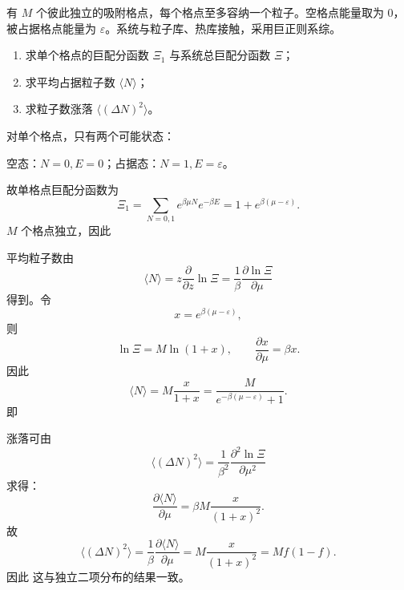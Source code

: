 \begin{question}
有 $M$ 个彼此独立的吸附格点，每个格点至多容纳一个粒子。空格点能量取为 $0$，被占据格点能量为 $\varepsilon$。系统与粒子库、热库接触，采用巨正则系综。

\begin{enumerate}[label=(\arabic*),leftmargin=2.5em]
  \item 求单个格点的巨配分函数 $\Xi_1$ 与系统总巨配分函数 $\Xi$；
  \item 求平均占据粒子数 $\langle N\rangle$；
  \item 求粒子数涨落 $\langle(\Delta N)^2\rangle$。
\end{enumerate}

\begin{solution}
对单个格点，只有两个可能状态：

空态：$N=0,E=0$；\qquad 占据态：$N=1,E=\varepsilon$。

故单格点巨配分函数为
\[
\Xi_1=\sum_{N=0,1} e^{\beta\mu N}e^{-\beta E}
=1+e^{\beta(\mu-\varepsilon)}.
\]
$M$ 个格点独立，因此

平均粒子数由
\[
\langle N\rangle
=z\frac{\partial}{\partial z}\ln \Xi
=\frac{1}{\beta}\frac{\partial \ln\Xi}{\partial\mu}
\]
得到。令
\[
x=e^{\beta(\mu-\varepsilon)},
\]
则
\[
\ln\Xi=M\ln(1+x),
\qquad
\frac{\partial x}{\partial\mu}=\beta x.
\]
因此
\[
\langle N\rangle
=M\frac{x}{1+x}
=
\frac{M}{e^{-\beta(\mu-\varepsilon)}+1}.
\]
即

涨落可由
\[
\langle(\Delta N)^2\rangle
=\frac{1}{\beta^2}\frac{\partial^2 \ln\Xi}{\partial\mu^2}
\]
求得：
\[
\frac{\partial \langle N\rangle}{\partial\mu}
=\beta M\frac{x}{(1+x)^2}.
\]
故
\[
\langle(\Delta N)^2\rangle
=\frac{1}{\beta}\frac{\partial \langle N\rangle}{\partial\mu}
=M\frac{x}{(1+x)^2}
=Mf(1-f).
\]
因此
这与独立二项分布的结果一致。
\end{solution}
\end{question}
